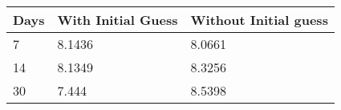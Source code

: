 \begin{tabular}{lll}
Days & With Initial Guess & Without Initial guess \\ 
\hline 
7 & 8.1436 & 8.0661 \\ 
14 & 8.1349 & 8.3256 \\ 
30 & 7.444 & 8.5398 \\ 
\hline 
\end{tabular}